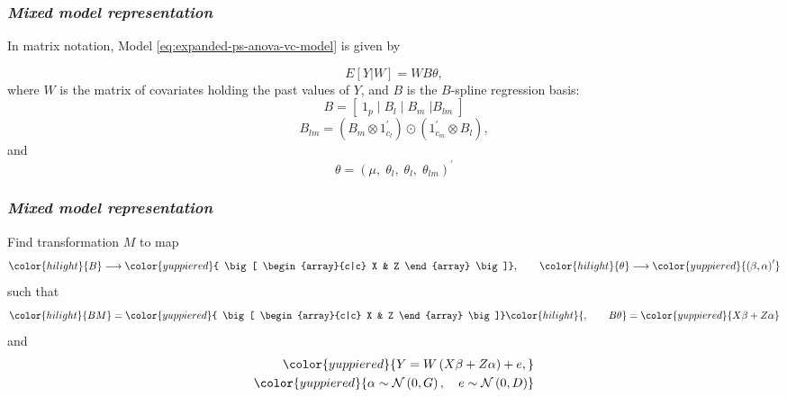 \documentclass[12pt]{beamer}
\newcommand{\newmaththought}[1]{{ \color{hilight} {#1}}}
\newcommand{\mixedmodelmath}[1]{{ \color{yuppiered} {#1}}}
\newcommand{\ms}{\scriptscriptstyle}
\begin{document}
\begin{frame}
\frametitle{\emph{Mixed model representation}}


In matrix notation, Model \ref{eq:expanded-ps-anova-vc-model} is given by

\begin{equation*}  
E \left[ Y | W \right] = WB \theta,
\end{equation*}
\noindent
where $W$ is the matrix of covariates holding the past values of $Y$, and $B$ is the $B$-spline regression basis:
\begin{equation} \label{eq:SANOVA-basis-matrix}
B = \left[\; 1_p \; \vert \;  B_l  \; \vert \;   B_m \; \vert B_{lm} \; \right]
\end{equation}
\noindent
\begin{equation*} \label{eq:rowwise-kronecker-product}
B_{lm}= \left( B_m \otimes 1^\prime_{c_l} \right) \odot \left(1^\prime_{c_m} \otimes  B_l  \right),
\end{equation*}
\noindent
and
\begin{equation*} 
\theta = \left(\mu, \;\theta_{\ms l}, \;\theta_{\ms l}, \;\theta_{\ms{lm}} \right)^\prime
\end{equation*}
\end{frame}





\begin{frame}
\frametitle{\emph{Mixed model representation}}

Find transformation $M$ to map
\begin{equation*}
\newmaththought{B} \longrightarrow \mixedmodelmath{ \big[ \begin{array}{c|c} X & Z \end{array}  \big]}, \qquad \newmaththought{\theta} \longrightarrow \mixedmodelmath{\left( \beta, \alpha \right)^\prime}
\end{equation*}
\noindent
such that 
\begin{equation*}
\newmaththought{BM} =\mixedmodelmath{ \big[ \begin{array}{c|c} X & Z \end{array}  \big]}\newmaththought{, \qquad B \theta} = \mixedmodelmath{X \beta + Z \alpha}
\end{equation*}
\noindent
and
\begin{align} 
\begin{split} \label{eq:vc-mixed-effects-model}
\mixedmodelmath{Y = W\left(X \beta + Z \alpha\right) + e, }\\
\mixedmodelmath{ \alpha \sim \mathcal{N}\left(0,G \right), \quad e\sim\mathcal{N}\left(0, D \right)}
\end{split}
\end{align} 

\end{frame}
\end{document}
